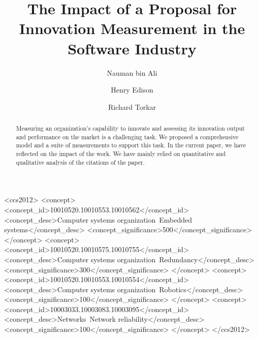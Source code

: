 \documentclass[sigplan]{acmart}
\begin{document}
\title{The Impact of a Proposal for Innovation Measurement in the Software Industry}

\author{Nauman bin Ali}

\author{Henry Edison}

\author{Richard Torkar}


\renewcommand{\shortauthors}{Ali et al.}




\begin{abstract}
Measuring an organization's capability to innovate and assessing its innovation output and performance on the market is a challenging task. We proposed a comprehensive model and a suite of measurements to support this task. In the current paper, we have reflected on the impact of the work. We have mainly relied on quantitative and qualitative analysis of the citations of the paper.  
\end{abstract}

\begin{CCSXML}
<ccs2012>
 <concept>
  <concept_id>10010520.10010553.10010562</concept_id>
  <concept_desc>Computer systems organization~Embedded systems</concept_desc>
  <concept_significance>500</concept_significance>
 </concept>
 <concept>
  <concept_id>10010520.10010575.10010755</concept_id>
  <concept_desc>Computer systems organization~Redundancy</concept_desc>
  <concept_significance>300</concept_significance>
 </concept>
 <concept>
  <concept_id>10010520.10010553.10010554</concept_id>
  <concept_desc>Computer systems organization~Robotics</concept_desc>
  <concept_significance>100</concept_significance>
 </concept>
 <concept>
  <concept_id>10003033.10003083.10003095</concept_id>
  <concept_desc>Networks~Network reliability</concept_desc>
  <concept_significance>100</concept_significance>
 </concept>
</ccs2012>
\end{CCSXML}
\end{document}
